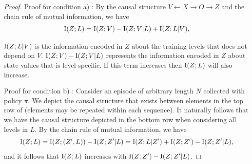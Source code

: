 \LEMmiZZandZL*
\begin{proof}
    
    Proof for condition a) : By the causal structure $V \leftarrow X \rightarrow O \rightarrow Z$ and the chain rule of mutual information, we have
    \begin{equation*}
    \text{I}(Z;L) = \text{I}(Z;V) - \text{I}(Z;V|L) + \text{I}(Z;L|V),
    \end{equation*}

    $\text{I}(Z;L|V)$ is the information encoded in $Z$ about the training levels that does not depend on $V$. $\text{I}(Z;V) - \text{I}(Z;V|L)$ represents the information encoded in $Z$ about state values that is level-specific. If this term increases then $\text{I}(Z;L)$ will also increase.

    Proof for condition b) : Consider an episode of arbitrary length $N$ collected with policy $\pi$. We depict the causal structure that exists between elements in the top row of  (elements may be repeated within each sequence). It naturally follows that we have the causal structure depicted in the bottom row when considering all levels in $L$. By the chain rule of mutual information, we have
    \begin{equation*}
        \text{I}(Z;L) = \text{I}(Z;(Z',L)) - \text{I}(Z;Z'|L) = \text{I}(Z;L|Z') + \text{I}(Z;Z') - \text{I}(Z;Z'|L),
    \end{equation*}
    and it follows that $\text{I}(Z;L)$ increases with $\text{I}(Z;Z') - \text{I}(Z;Z'|L)$. 
    
\end{proof}



